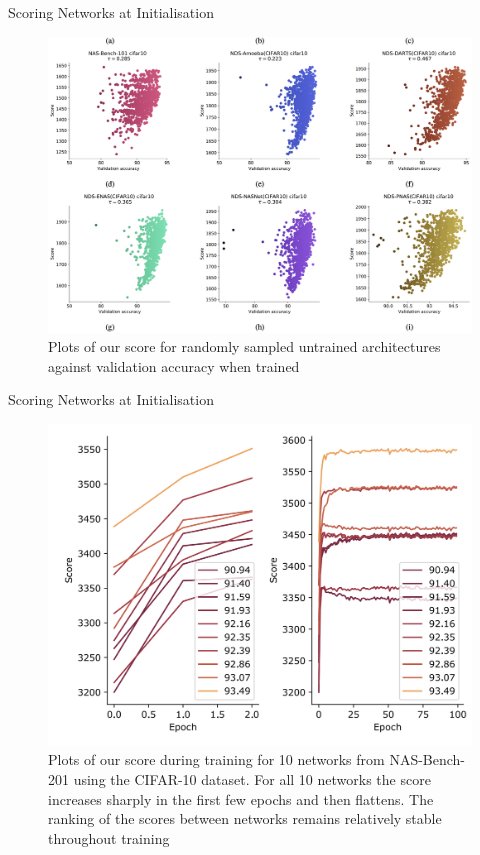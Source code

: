 \documentclass{beamer}
\begin{document}
\begin{frame}{Scoring Networks at Initialisation}
    \begin{block}{}
        \begin{figure}{}
            \centering
            \includegraphics[scale=0.23]{images/figure3.png}
            \caption{Plots of our score for randomly sampled untrained architectures against validation accuracy when trained}
            \label{fig:enter-label}
        \end{figure}
    \end{block}
\end{frame}

\begin{frame}{Scoring Networks at Initialisation}
    \begin{block}{}
        \begin{figure}{}
            \centering
            \includegraphics[scale=0.27]{images/figure6.png}
            \caption{Plots of our score during training for 10
networks from NAS-Bench-201 using the CIFAR-10 dataset. For all 10 networks the score increases sharply in the first few epochs and then flattens. The ranking of the scores between networks remains relatively stable throughout
training}
            \label{fig:enter-label}
        \end{figure}
    \end{block}
\end{frame}
\end{document}
